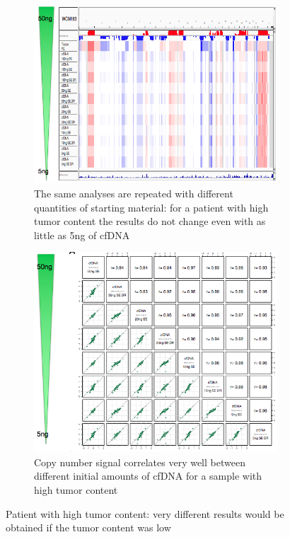 \begin{figure}[!ht]
\centering
\begin{subfigure}{.4\textwidth}
    \centering
    \includegraphics[width=\linewidth]{quantity1.png}
    \caption{The same analyses are repeated with different quantities of starting material: for a patient with high tumor content the results do not change even with as little as 5ng of cfDNA}
\end{subfigure}
%
\begin{subfigure}{.4\textwidth}
    \centering
    \includegraphics[width=\linewidth]{quantity2.png}
    \caption{Copy number signal correlates very well between different initial amounts of cfDNA for a sample with high tumor content}
\end{subfigure}
\caption{\label{fig:quan}Patient with high tumor content: very different results would be obtained if the tumor content was low}
\end{figure}



